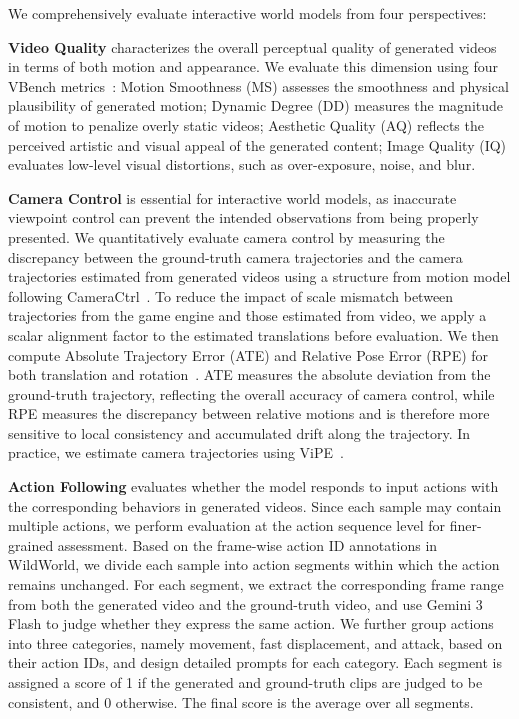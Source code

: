 We comprehensively evaluate interactive world models from four perspectives: 

\noindent
\textbf{Video Quality} characterizes the overall perceptual quality of generated videos in terms of both motion and appearance. 
We evaluate this dimension using four VBench metrics~\cite{huang2024vbench}: Motion Smoothness (MS) assesses the smoothness and physical plausibility of generated motion; Dynamic Degree (DD) measures the magnitude of motion to penalize overly static videos; Aesthetic Quality (AQ) reflects the perceived artistic and visual appeal of the generated content; Image Quality (IQ) evaluates low-level visual distortions, such as over-exposure, noise, and blur.

\noindent
\textbf{Camera Control} is essential for interactive world models, as inaccurate viewpoint control can prevent the intended observations from being properly presented.
We quantitatively evaluate camera control by measuring the discrepancy between the ground-truth camera trajectories and the camera trajectories estimated from generated videos using a structure from motion model following CameraCtrl~\cite{he2024cameractrl}.
To reduce the impact of scale mismatch between trajectories from the game engine and those estimated from video, we apply a scalar alignment factor to the estimated translations before evaluation.
We then compute Absolute Trajectory Error (ATE) and Relative Pose Error (RPE) for both translation and rotation~\cite{sturm2012benchmark}.
ATE measures the absolute deviation from the ground-truth trajectory, reflecting the overall accuracy of camera control, while RPE measures the discrepancy between relative motions and is therefore more sensitive to local consistency and accumulated drift along the trajectory.
In practice, we estimate camera trajectories using ViPE~\cite{huang2025vipe}.

\noindent
\textbf{Action Following} evaluates whether the model responds to input actions with the corresponding behaviors in generated videos.
Since each sample may contain multiple actions, we perform evaluation at the action sequence level for finer-grained assessment.
Based on the frame-wise action ID annotations in WildWorld, we divide each sample into action segments within which the action remains unchanged.
For each segment, we extract the corresponding frame range from both the generated video and the ground-truth video, and use Gemini 3 Flash to judge whether they express the same action.
We further group actions into three categories, namely movement, fast displacement, and attack, based on their action IDs, and design detailed prompts for each category.
Each segment is assigned a score of 1 if the generated and ground-truth clips are judged to be consistent, and 0 otherwise.
The final score is the average over all segments.


